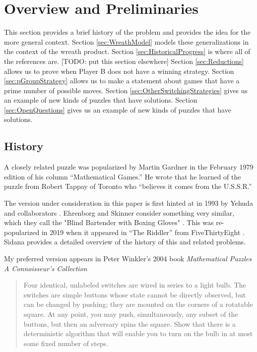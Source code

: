 \section{Overview and Preliminaries}
This section provides a brief history of the problem and provides the idea for the more general context.
Section \ref{sec:WreathModel} models these generalizations in the context of the wreath product.
Section \ref{sec:HistoricalProgress} is where all of the references are. [TODO: put this section elsewhere]
Section \ref{sec:Reductions} allows us to prove when Player B does not have a winning strategy.
Section \ref{sec:pGroupStrategy} allows us to make a statement about games that have a prime number of possible moves.
Section \ref{sec:OtherSwitchingStrategies} gives us an example of new kinds of puzzles that have solutions.
Section \ref{sec:OpenQuestions} gives us an example of new kinds of puzzles that have solutions.

\subsection{History}
A closely related puzzle was popularized by Martin Gardner in the
February 1979 edition of his column ``Mathematical Games.'' \cite{Gardner1979Problem}
He wrote that he learned of the puzzle from Robert Tappay of Toronto who
``believes it comes from the U.S.S.R.''

The version under consideration in this paper is first hinted at in 1993
by Yehuda and collaborators \cite{Yehuda1993}.
Ehrenborg and Skinner consider something very similar, which they call the
"Blind Bartender with Boxing Gloves" \cite{Ehrenborg1995}.
This was re-popularized in 2019 when it appeared in ``The Riddler'' from
FiveThirtyEight \cite{FiveThirtyEight}.
Sidana \cite{Sidana2020} provides a detailed overview of the history of this
and related problems.

My preferred version appears in Peter Winkler's 2004 book
\textit{Mathematical Puzzles A Connoisseur's Collection}
\begin{quote}
  Four identical, unlabeled switches are wired in series to a light bulb.
  The switches are simple buttons whose state cannot be directly observed,
  but can be changed by pushing; they are mounted on the corners of a
  rotatable square. At any point, you may push, simultaneously, any subset
  of the buttons, but then an adversary spins the square. Show that there
  is a deterministic algorithm that will enable you to turn on the bulb in
  at most some fixed number of steps. \cite{Winkler2004}
\end{quote}

